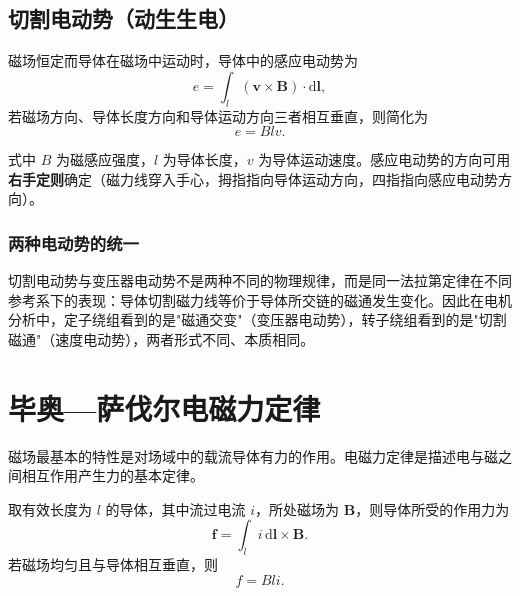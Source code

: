 \subsection{切割电动势（动生生电）}
磁场恒定而导体在磁场中运动时，导体中的感应电动势为
\begin{equation}
e=\int_{l}\left(\boldsymbol{v}\times\boldsymbol{B}\right)\cdot \mathrm{d}\boldsymbol{l},
\end{equation}
若磁场方向、导体长度方向和导体运动方向三者相互垂直，则简化为
\begin{equation}
e=Blv .
\end{equation}


式中 $B$ 为磁感应强度，$l$ 为导体长度，$v$ 为导体运动速度。感应电动势的方向可用\textbf{右手定则}确定（磁力线穿入手心，拇指指向导体运动方向，四指指向感应电动势方向）。

\subsubsection{两种电动势的统一}
切割电动势与变压器电动势不是两种不同的物理规律，而是同一法拉第定律在不同参考系下的表现：导体切割磁力线等价于导体所交链的磁通发生变化。因此在电机分析中，定子绕组看到的是"磁通交变"（变压器电动势），转子绕组看到的是"切割磁通"（速度电动势），两者形式不同、本质相同。


\section{毕奥—萨伐尔电磁力定律}

磁场最基本的特性是对场域中的载流导体有力的作用。电磁力定律是描述电与磁之间相互作用产生力的基本定律。

取有效长度为 $l$ 的导体，其中流过电流 $i$，所处磁场为 $\boldsymbol{B}$，则导体所受的作用力为
\begin{equation}
\boldsymbol{f}=\int_{l}i\,\mathrm{d}\boldsymbol{l}\times\boldsymbol{B}.
\end{equation}
若磁场均匀且与导体相互垂直，则
\begin{equation}
f=Bli .
\end{equation}


